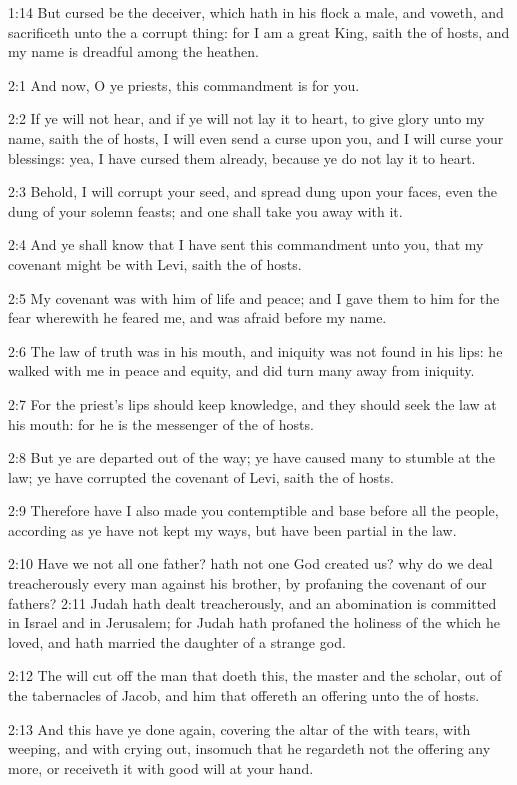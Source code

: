 1:14 But cursed be the deceiver, which hath in his flock a male, and voweth, and sacrificeth unto the \LORD a corrupt thing: for I am a great King, saith the \LORD of hosts, and my name is dreadful among the heathen.

2:1 And now, O ye priests, this commandment is for you.

2:2 If ye will not hear, and if ye will not lay it to heart, to give glory unto my name, saith the \LORD of hosts, I will even send a curse upon you, and I will curse your blessings: yea, I have cursed them already, because ye do not lay it to heart.

2:3 Behold, I will corrupt your seed, and spread dung upon your faces, even the dung of your solemn feasts; and one shall take you away with it.

2:4 And ye shall know that I have sent this commandment unto you, that my covenant might be with Levi, saith the \LORD of hosts.

2:5 My covenant was with him of life and peace; and I gave them to him for the fear wherewith he feared me, and was afraid before my name.

2:6 The law of truth was in his mouth, and iniquity was not found in his lips: he walked with me in peace and equity, and did turn many away from iniquity.

2:7 For the priest's lips should keep knowledge, and they should seek the law at his mouth: for he is the messenger of the \LORD of hosts.

2:8 But ye are departed out of the way; ye have caused many to stumble at the law; ye have corrupted the covenant of Levi, saith the \LORD of hosts.

2:9 Therefore have I also made you contemptible and base before all the people, according as ye have not kept my ways, but have been partial in the law.

2:10 Have we not all one father? hath not one God created us? why do we deal treacherously every man against his brother, by profaning the covenant of our fathers?  2:11 Judah hath dealt treacherously, and an abomination is committed in Israel and in Jerusalem; for Judah hath profaned the holiness of the \LORD which he loved, and hath married the daughter of a strange god.

2:12 The \LORD will cut off the man that doeth this, the master and the scholar, out of the tabernacles of Jacob, and him that offereth an offering unto the \LORD of hosts.

2:13 And this have ye done again, covering the altar of the \LORD with tears, with weeping, and with crying out, insomuch that he regardeth not the offering any more, or receiveth it with good will at your hand.

